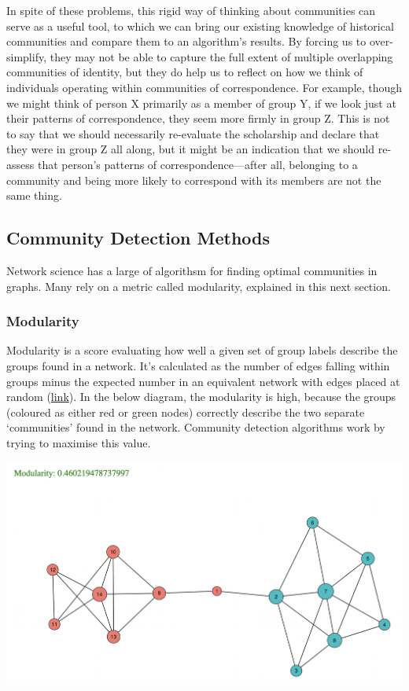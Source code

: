\documentclass[
]{book}
\begin{document}
In spite of these problems, this rigid way of thinking about communities can serve as a useful tool, to which we can bring our existing knowledge of historical communities and compare them to an algorithm's results. By forcing us to over-simplify, they may not be able to capture the full extent of multiple overlapping communities of identity, but they do help us to reflect on how we think of individuals operating within communities of correspondence. For example, though we might think of person X primarily as a member of group Y, if we look just at their patterns of correspondence, they seem more firmly in group Z. This is not to say that we should necessarily re-evaluate the scholarship and declare that they were in group Z all along, but it might be an indication that we should re-assess that person's patterns of correspondence---after all, belonging to a community and being more likely to correspond with its members are not the same thing.~

\hypertarget{community-detection-methods}{%
\subsection{Community Detection Methods}\label{community-detection-methods}}

Network science has a large of algorithsm for finding optimal communities in graphs. Many rely on a metric called modularity, explained in this next section.

\hypertarget{modularity}{%
\subsubsection{Modularity}\label{modularity}}

Modularity is a score evaluating how well a given set of group labels describe the groups found in a network. It's calculated as the number of edges falling within groups minus the expected number in an equivalent network with edges placed at random (\href{https://www.pnas.org/content/103/23/8577}{link}). In the below diagram, the modularity is high, because the groups (coloured as either red or green nodes) correctly describe the two separate `communities' found in the network. Community detection algorithms work by trying to maximise this value.

\includegraphics{images/modularity.png}
\end{document}
